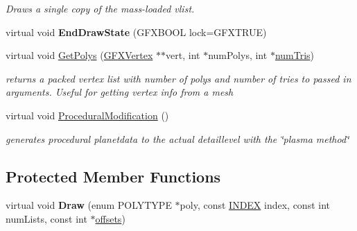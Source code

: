 \begin{DoxyCompactItemize}
\begin{DoxyCompactList}\small\item\em Draws a single copy of the mass-\/loaded vlist. \end{DoxyCompactList}\item 
virtual void {\bfseries End\+Draw\+State} (G\+F\+X\+B\+O\+OL lock=G\+F\+X\+T\+R\+UE)\hypertarget{classGFXSphereVertexList_a51b4ea78f0d21958aa342b3a46dc7f30}{}\label{classGFXSphereVertexList_a51b4ea78f0d21958aa342b3a46dc7f30}

\item 
virtual void \hyperlink{classGFXSphereVertexList_a4088433d33f095b6a441a7c77c9f75e4}{Get\+Polys} (\hyperlink{structGFXVertex}{G\+F\+X\+Vertex} $\ast$$\ast$vert, int $\ast$num\+Polys, int $\ast$\hyperlink{classGFXVertexList_af0ca7d06410f649c6d1d506121c4f6da}{num\+Tris})\hypertarget{classGFXSphereVertexList_a4088433d33f095b6a441a7c77c9f75e4}{}\label{classGFXSphereVertexList_a4088433d33f095b6a441a7c77c9f75e4}

\begin{DoxyCompactList}\small\item\em returns a packed vertex list with number of polys and number of tries to passed in arguments. Useful for getting vertex info from a mesh \end{DoxyCompactList}\item 
virtual void \hyperlink{classGFXSphereVertexList_a76d93b953b1cc9fda46cb58a359e2cb0}{Procedural\+Modification} ()\hypertarget{classGFXSphereVertexList_a76d93b953b1cc9fda46cb58a359e2cb0}{}\label{classGFXSphereVertexList_a76d93b953b1cc9fda46cb58a359e2cb0}

\begin{DoxyCompactList}\small\item\em generates procedural planetdata to the actual detaillevel with the \char`\"{}plasma method\char`\"{} \end{DoxyCompactList}\end{DoxyCompactItemize}
\subsection*{Protected Member Functions}
\begin{DoxyCompactItemize}
\item 
virtual void {\bfseries Draw} (enum P\+O\+L\+Y\+T\+Y\+PE $\ast$poly, const \hyperlink{unionGFXVertexList_1_1INDEX}{I\+N\+D\+EX} index, const int num\+Lists, const int $\ast$\hyperlink{classGFXVertexList_a0310e1bd4dbc7bfb1240b200368ce8c9}{offsets})\hypertarget{classGFXSphereVertexList_ae16a2d54788c580593414574a8e866d4}{}\label{classGFXSphereVertexList_ae16a2d54788c580593414574a8e866d4}

\end{DoxyCompactItemize}
